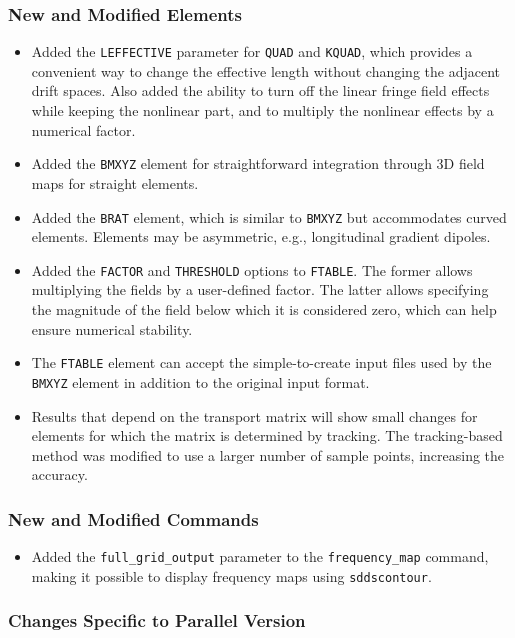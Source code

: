 \documentclass[11pt]{article}
\begin{document}
\subsubsection{New and Modified Elements}
\begin{itemize}
\item Added the \verb|LEFFECTIVE| parameter for \verb|QUAD| and \verb|KQUAD|, which provides a convenient way
  to change the effective length without changing the adjacent drift spaces. Also added the ability to turn off
  the linear fringe field effects while keeping the nonlinear part, and to multiply the nonlinear effects by
  a numerical factor.
\item Added the \verb|BMXYZ| element for straightforward integration through 3D field maps for straight elements.
\item Added the \verb|BRAT| element, which is similar to \verb|BMXYZ| but accommodates curved elements. Elements may
  be asymmetric, e.g., longitudinal gradient dipoles.
\item Added the \verb|FACTOR| and \verb|THRESHOLD| options to \verb|FTABLE|. The former allows multiplying the fields
  by a user-defined factor. The latter allows specifying the magnitude of the field below which it is considered
  zero, which can help ensure numerical stability.
\item The \verb|FTABLE| element can accept the simple-to-create input files used by the \verb|BMXYZ| element in addition
  to the original input format.
\item Results that depend on the transport matrix will show small changes for elements for which the matrix is determined by tracking.
  The tracking-based method was modified to use a larger number of sample points, increasing the accuracy.
\end{itemize}

\subsubsection{New and Modified Commands}
\begin{itemize}
\item Added the \verb|full_grid_output| parameter to the \verb|frequency_map| command, making it possible to display 
  frequency maps using \verb|sddscontour|.
\end{itemize}

\subsubsection{Changes Specific to Parallel Version}
\end{document}

